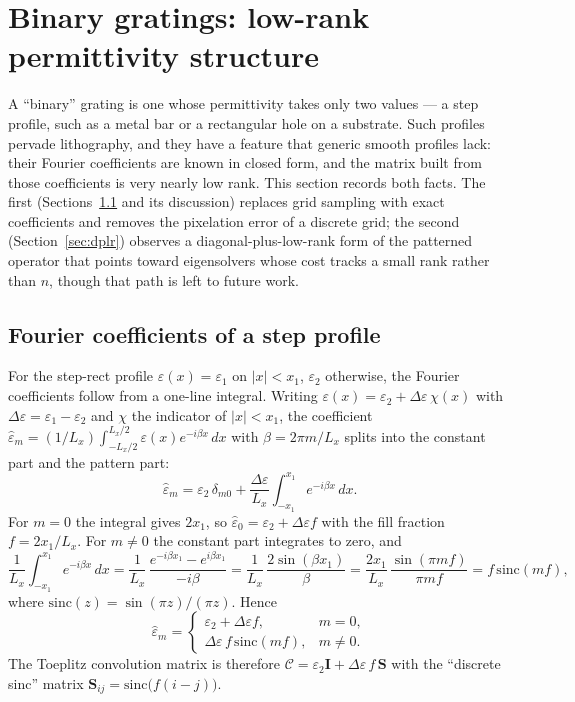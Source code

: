 \documentclass[11pt]{article}
\theoremstyle{remark}
\newcommand{\eps}{\varepsilon}
\newcommand{\Cmat}{\mathcal{C}}
\newcommand{\Id}{\mathbf{I}}
\begin{document}
\section{Binary gratings: low-rank permittivity structure}
\label{sec:binary}

A ``binary'' grating is one whose permittivity takes only two values --- a step
profile, such as a metal bar or a rectangular hole on a substrate.  Such
profiles pervade lithography, and they have a feature that generic smooth
profiles lack: their Fourier coefficients are known in closed form, and the
matrix built from those coefficients is very nearly low rank.  This section
records both facts.  The first (Sections~\ref{sec:epshat} and its discussion)
replaces grid sampling with exact coefficients and removes the pixelation error
of a discrete grid; the second
(Section~\ref{sec:dplr}) observes a diagonal-plus-low-rank form of the
patterned operator that points toward eigensolvers whose cost tracks a small
rank rather than $n$, though that path is left to future work.

\subsection{Fourier coefficients of a step profile}
\label{sec:epshat}

For the step-rect profile
$\varepsilon(x)=\varepsilon_1$ on $|x|<x_1$, $\varepsilon_2$ otherwise, the
Fourier coefficients follow from a one-line integral. Writing
$\varepsilon(x)=\varepsilon_2+\Delta\eps\,\chi(x)$ with
$\Delta\eps=\varepsilon_1-\varepsilon_2$ and $\chi$ the indicator of
$|x|<x_1$, the coefficient
$\hat\eps_m=(1/L_x)\int_{-L_x/2}^{L_x/2}\varepsilon(x)e^{-i\beta x}\,dx$ with
$\beta=2\pi m/L_x$ splits into the constant part and the pattern part:
\begin{equation}
\hat\eps_m=\varepsilon_2\,\delta_{m0}+\frac{\Delta\eps}{L_x}
\int_{-x_1}^{x_1}e^{-i\beta x}\,dx.
\end{equation}
For $m=0$ the integral gives $2x_1$, so
$\hat\eps_0=\varepsilon_2+\Delta\eps f$ with the fill fraction
$f=2x_1/L_x$.  For $m\neq0$ the constant part integrates to zero, and
\begin{equation}
\frac{1}{L_x}\int_{-x_1}^{x_1}e^{-i\beta x}\,dx
=\frac{1}{L_x}\,\frac{e^{-i\beta x_1}-e^{i\beta x_1}}{-i\beta}
=\frac{1}{L_x}\,\frac{2\sin(\beta x_1)}{\beta}
=\frac{2x_1}{L_x}\,\frac{\sin(\pi m f)}{\pi m f}
=f\,\mathrm{sinc}(m f),
\end{equation}
where $\mathrm{sinc}(z)=\sin(\pi z)/(\pi z)$.  Hence
\begin{equation}
\hat\eps_m=
\begin{cases}
\varepsilon_2+\Delta\eps f,& m=0,\\[2pt]
\Delta\eps\, f\,\mathrm{sinc}(m f),& m\neq0.
\end{cases}
\label{eq:epshat}
\end{equation}
The Toeplitz convolution matrix is therefore
$\Cmat=\varepsilon_2\Id+\Delta\eps\, f\,\mathbf{S}$ with the ``discrete sinc''
matrix $\mathbf{S}_{ij}=\mathrm{sinc}\big(f(i-j)\big)$.
\end{document}
